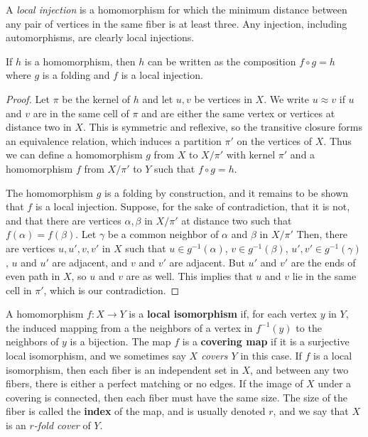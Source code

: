 A \textit{local injection} is a homomorphism for which the minimum distance between any pair of vertices in the same fiber is at least three.  Any injection, including automorphisms, are clearly local injections.


\begin{lemma}
If $h$ is a homomorphism, then $h$ can be written as the composition $f\circ g=h$ where $g$ is a folding and $f$ is a local injection.
\end{lemma}
\begin{proof}
	Let $\pi$ be the kernel of $h$ and let $u,v$ be vertices in $X$.  We write $u\approx v$ if $u$ and $v$ are in the same cell of $\pi$ and are either the same vertex or vertices at distance two in $X$.  This is symmetric and reflexive, so the transitive closure forms an equivalence relation, which induces a partition $\pi'$ on the vertices of $X$.  Thus we can define a homomorphism $g$ from $X$ to $X{/}\pi'$ with kernel $\pi'$ and a homomorphism $f$ from $X{/}\pi'$ to $Y$ such that $f\circ g=h$.
	
	The homomorphism $g$ is a folding by construction, and it remains to be shown that $f$ is a local injection.  Suppose, for the sake of contradiction, that it is not, and that there are vertices $\alpha,\beta$ in $X{/}\pi'$ at distance two such that $f(\alpha)=f(\beta)$.  Let $\gamma$ be a common neighbor of $\alpha$ and $\beta$ in $X{/}\pi'$  Then, there are vertices $u,u',v,v'$ in $X$ such that $u\in g^{-1}(\alpha)$, $v\in g^{-1}(\beta)$, $u',v'\in g^{-1}(\gamma)$, $u$ and $u'$ are adjacent, and $v$ and $v'$ are adjacent.  But $u'$ and $v'$ are the ends of  even path in $X$, so $u$ and $v$ are as well.  This implies that $u$ and $v$ lie in the same cell in $\pi'$, which is our contradiction.
\end{proof}

A homomorphism $f:X\rightarrow Y$ is a \textbf{local isomorphism} if, for each vertex $y$ in $Y$, the induced mapping from a the neighbors of a vertex in $f^{-1}(y)$ to the neighbors of $y$ is a bijection.  The map $f$ is a \textbf{covering map} if it is a surjective local isomorphism, and we sometimes say \textit{$X$ covers $Y$} in this case.  If $f$ is a local isomorphism, then each fiber is an independent set in $X$, and between any two fibers, there is either a perfect matching or no edges.  If the image of $X$ under a covering is connected, then each fiber must have the same size.  The size of the fiber is called the \textbf{index} of the map, and is usually denoted $r$, and we say that $X$ is an \textit{$r$-fold cover} of $Y$.  

